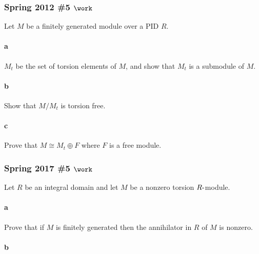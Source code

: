 \hypertarget{spring-2012-5-work}{%
\subsubsection{\texorpdfstring{Spring 2012 \#5
\(\work\)}{Spring 2012 \#5 \textbackslash work}}\label{spring-2012-5-work}}

Let \(M\) be a finitely generated module over a PID \(R\).

\hypertarget{a-93}{%
\paragraph{a}\label{a-93}}

\(M_t\) be the set of torsion elements of \(M\), and show that \(M_t\)
is a submodule of \(M\).

\hypertarget{b-83}{%
\paragraph{b}\label{b-83}}

Show that \(M/M_t\) is torsion free.

\hypertarget{c-55}{%
\paragraph{c}\label{c-55}}

Prove that \(M \cong M_t \oplus F\) where \(F\) is a free module.

\hypertarget{spring-2017-5-work}{%
\subsubsection{\texorpdfstring{Spring 2017 \#5
\(\work\)}{Spring 2017 \#5 \textbackslash work}}\label{spring-2017-5-work}}

Let \(R\) be an integral domain and let \(M\) be a nonzero torsion
\(R{\hbox{-}}\)module.

\hypertarget{a-94}{%
\paragraph{a}\label{a-94}}

Prove that if \(M\) is finitely generated then the annihilator in \(R\)
of \(M\) is nonzero.

\hypertarget{b-84}{%
\paragraph{b}\label{b-84}}

